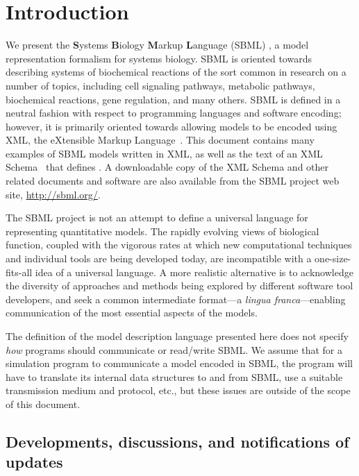
\section{Introduction}
\label{sec:introduction}

We present the \textbf{S}ystems \textbf{B}iology \textbf{M}arkup
\textbf{L}anguage (SBML) \sbmltwotwo, a model
representation formalism for systems biology.  SBML is oriented
towards describing systems of biochemical reactions of the sort
common in research on a number of topics, including cell signaling
pathways, metabolic pathways, biochemical reactions, gene
regulation, and many others.  SBML is defined in a neutral fashion
with respect to programming languages and software encoding;
however, it is primarily oriented towards allowing models to be
encoded using XML, the eXtensible Markup
Language~\citep{bosak:1999,bray:2000}.  This document contains
many examples of SBML models written in XML, as well as the text
of an XML Schema~\citep{biron:2000,fallside:2000,thompson:2000}
that defines \sbmltwotwo.  A downloadable copy of the XML Schema
and other related documents and software are also available from
the SBML project web site, \url{http://sbml.org/}.

The SBML project is not an attempt to define a universal language
for representing quantitative models.  The rapidly evolving views
of biological function, coupled with the vigorous rates at which
new computational techniques and individual tools are being
developed today, are incompatible with a one-size-fits-all idea of
a universal language. A more realistic alternative is to
acknowledge the diversity of approaches and methods being explored
by different software tool developers, and seek a common
intermediate format---a \emph{lingua franca}---enabling
communication of the most essential aspects of the models.

The definition of the model description language presented here
does not specify \emph{how} programs should communicate or
read/write SBML.  We assume that for a simulation program to
communicate a model encoded in SBML, the program will have to
translate its internal data structures to and from SBML, use a
suitable transmission medium and protocol, etc., but these issues
are outside of the scope of this document.

\subsection{Developments, discussions, and notifications of updates}

